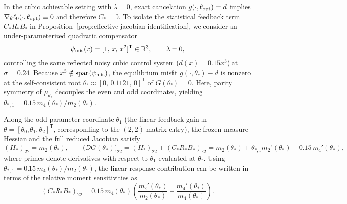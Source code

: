 In the cubic achievable setting with $\lambda=0$, exact cancelation $g(\cdot,\theta_{\rm opt})=d$ implies $\nabla_\theta\ell_0(\cdot,\theta_{\rm opt})\equiv 0$ and therefore $C_*=0$. To isolate the statistical feedback term $C_*R_*B_*$ in Proposition~\ref{prop:effective-jacobian-identification}, we consider an under-parameterized quadratic compensator
\begin{equation}
    \psi_{\rm mis}(x) = [1,\, x,\, x^2]^{\mathsf T} \in \mathbb{R}^3, \qquad \lambda = 0,
\end{equation}
controlling the same reflected noisy cubic control system ($d(x)=0.15x^3$) at $\sigma=0.24$. Because $x^3 \notin \operatorname{span}(\psi_{\rm mis})$, the equilibrium misfit $g(\cdot,\theta_*)-d$ is nonzero at the self-consistent root $\theta_* \approx [0,\, 0.1121,\, 0]^{\mathsf T}$ of $\overline G(\theta_*)=0$. Here, parity symmetry of $\mu_{\theta_*}$ decouples the even and odd coordinates, yielding $\theta_{*,1} = 0.15\,m_4(\theta_*)/m_2(\theta_*)$.

Along the odd parameter coordinate $\theta_1$ (the linear feedback gain in $\theta=[\theta_0,\theta_1,\theta_2]^{\mathsf T}$, corresponding to the $(2,2)$ matrix entry), the frozen-measure Hessian and the full reduced Jacobian satisfy
\begin{equation}
    (H_*)_{22} = m_2(\theta_*),
    \qquad
    \bigl(D\overline G(\theta_*)\bigr)_{22}
    = (H_*)_{22} + (C_*R_*B_*)_{22}
    = m_2(\theta_*) + \theta_{*,1}m_2'(\theta_*) - 0.15\,m_4'(\theta_*),
\end{equation}
where primes denote derivatives with respect to $\theta_1$ evaluated at $\theta_*$. Using $\theta_{*,1} = 0.15\,m_4(\theta_*)/m_2(\theta_*)$, the linear-response contribution can be written in terms of the relative moment sensitivities as
\begin{equation}
    (C_*R_*B_*)_{22}
    = 0.15\,m_4(\theta_*)
      \left(
        \frac{m_2'(\theta_*)}{m_2(\theta_*)}
        - \frac{m_4'(\theta_*)}{m_4(\theta_*)}
      \right).
    \label{eq:CRB22-relative-moments}
\end{equation}

